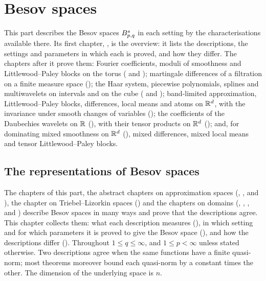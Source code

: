 
\part{Besov spaces}
\label{part:besov}

This part describes the Besov spaces $B^{s}_{p,q}$ in each setting by the characterisations
available there. Its first chapter, , is the overview: it lists the
descriptions, the settings and parameters in which each is proved, and how they differ. The
chapters after it prove them: Fourier coefficients, moduli of smoothness and Littlewood--Paley
blocks on the torus ( and ); martingale differences of a
filtration on a finite measure space (); the Haar system, piecewise
polynomials, splines and multiwavelets on intervals and on the cube ( and
); band-limited approximation, Littlewood--Paley blocks, differences, local means
and atoms on $\mathbb{R}^d$, with the invariance under smooth changes of variables (); the
coefficients of the Daubechies wavelets on $\mathbb{R}$ (), with their tensor products
on $\mathbb{R}^d$ (); and, for dominating mixed smoothness on $\mathbb{R}^d$
(), mixed differences, mixed local means and tensor Littlewood--Paley
blocks.

\chapter{The representations of Besov spaces}
\label{chap:representations}

The chapters of this part, the abstract chapters on approximation spaces
(, ,  and
), the chapter on Triebel--Lizorkin spaces () and
the chapters on domains (, ,
,  and )
describe Besov spaces in many ways and prove that the descriptions agree. This chapter collects
them: what each description measures
(), in which setting and for which parameters it is proved to give the
Besov space (), and how the descriptions differ ().
Throughout $1 \leq q \leq \infty$, and $1 \leq p < \infty$ unless stated otherwise. Two
descriptions agree when the same functions have a finite quasi-norm; most theorems moreover bound
each quasi-norm by a constant times the other. The dimension of the underlying space is $n$.

